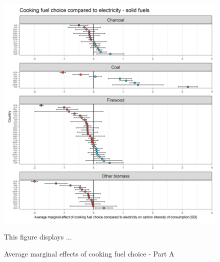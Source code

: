 \documentclass[12pt, a4paper]{article}
\newenvironment{subcaption}
{\strut
\vspace{-5pt}
\begin{minipage}[b]{0.9\textwidth}
  \hspace*{-\parindent}
  \footnotesize}
 {\end{minipage}}
\begin{document}
\begin{figure}[ht!]
  \centering
 \caption{Average marginal effects of cooking fuel choice - Part A} \label{fig:E6_Electricity_A}
  \includegraphics{Analysis_OLS_ME_Carbon_Intensity/AME_OLS_CI_CI_Electricity A}
  \begin{subcaption}
    This figure displays ...
  \end{subcaption}

\end{figure}

\clearpage
\end{document}
